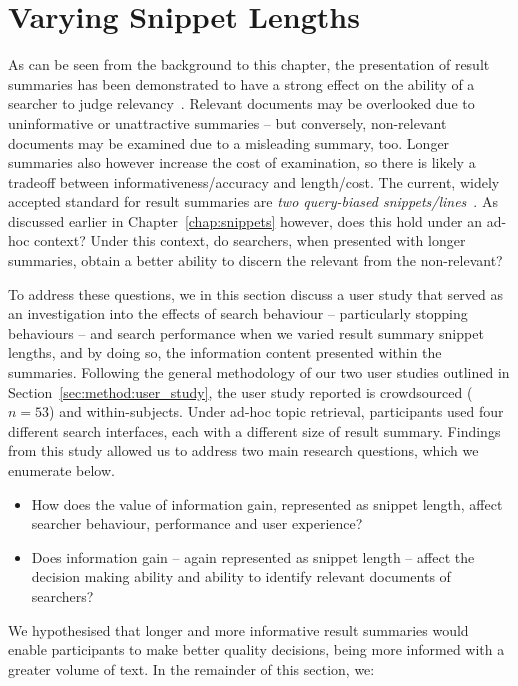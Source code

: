 \section{Varying Snippet Lengths}\label{chap:snippets:user}
As can be seen from the background to this chapter, the presentation of result summaries has been demonstrated to have a strong effect on the ability of a searcher to judge relevancy~\citep{he2012bridging}. Relevant documents may be overlooked due to uninformative or unattractive summaries -- but conversely, non-relevant documents may be examined due to a misleading summary, too. Longer summaries also however increase the cost of examination, so there is likely a tradeoff between informativeness/accuracy and length/cost. The current, widely accepted standard for result summaries are \emph{two query-biased snippets/lines}~\citep{hearst2009_search}. As discussed earlier in Chapter~\ref{chap:snippets} however, does this hold under an ad-hoc context? Under this context, do searchers, when presented with longer summaries, obtain a better ability to discern the relevant from the non-relevant?

To address these questions, we in this section discuss a user study that served as an investigation into the effects of search behaviour -- particularly stopping behaviours -- and search performance when we varied result summary snippet lengths, and by doing so, the information content presented within the summaries. Following the general methodology of our two user studies outlined in Section~\ref{sec:method:user_study}, the user study reported is crowdsourced ($n=53$) and within-subjects. Under ad-hoc topic retrieval, participants used four different search interfaces, each with a different size of result summary. Findings from this study allowed us to address two main research questions, which we enumerate below.

\begin{itemize}
    \item{ How does the value of information gain, represented as snippet length, affect searcher behaviour, performance and user experience?}
    \item{ Does information gain -- again represented as snippet length -- affect the decision making ability and ability to identify relevant documents of searchers?}
\end{itemize}

We hypothesised that longer and more informative result summaries would enable participants to make better quality decisions, being more informed with a greater volume of text. In the remainder of this section, we:

